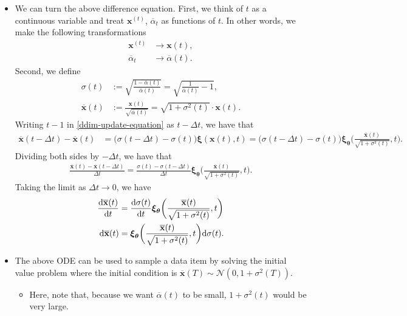 \documentclass[10pt]{article}
\newcommand{\dee}{\mathrm{d}}
\newcommand{\ve}[1]{\mathbf{#1}}
\newcommand{\ves}[1]{\boldsymbol{#1}}
\newcommand{\mcal}[1]{\mathcal{#1}}
\begin{document}
\begin{itemize}
  \item We can turn the above difference equation. First, we think of $t$ as a continuous variable and treat $\ve{x}^{(t)}$, $\overline{\alpha}_t$ as functions of $t$. In other words, we make the following transformations
  \begin{align*}
    \ve{x}^{(t)} &\rightarrow \ve{x}(t),\\
    \overline{\alpha}_t &\rightarrow \overline{\alpha}(t).
  \end{align*}
  Second, we define
  \begin{align*}
    \sigma(t) &:= \sqrt{\frac{1 - \overline{\alpha}(t)}{\overline{\alpha}(t)}} = \sqrt{\frac{1}{\overline{\alpha}(t)} - 1}, \\
    \overline{\ve{x}}(t)
    &:= \frac{\ve{x}(t)}{\sqrt{\overline{\alpha}(t)}} = \sqrt{1 + \sigma^2(t)} \cdot \ve{x}(t).    
  \end{align*}
  Writing $t-1$ in \eqref{ddim-update-equation} as $t - \Delta t$, we have that
  \begin{align*}
    \overline{\ve{x}}(t - \Delta t) - \overline{\ve{x}}(t)
    &= \big( \sigma(t - \Delta t) - \sigma(t) \big) \ves{\xi}(\ve{x}(t), t)
    = \big( \sigma(t - \Delta t) - \sigma(t) \big) \ves{\xi}_{\ves{\theta}}\bigg(\frac{\overline{\ve{x}}(t)}{\sqrt{1 + \sigma^2(t)}}, t\bigg).
  \end{align*}
  Dividing both sides by $-\Delta t$, we have that
  \begin{align*}
    \frac{\overline{\ve{x}}(t) - \overline{\ve{x}}(t - \Delta t)}{\Delta t}
    = \frac{\sigma(t) - \sigma(t - \Delta t)}{\Delta t} \ves{\xi}_{\ves{\theta}}\bigg( \frac{\overline{\ve{x}}(t)}{\sqrt{1 + \sigma^2(t)}}, t \bigg).
  \end{align*}
  Taking the limit as $\Delta t \rightarrow 0$, we have
  \begin{align}
    \frac{\dee \overline{\ve{x}}(t)}{\dee t}
    &= \frac{\dee \sigma(t)}{\dee t} \ves{\xi}_{\ves{\theta}}\bigg( \frac{\overline{\ve{x}}(t)}{\sqrt{1 + \sigma^2(t)}}, t \bigg) \notag \\
    \dee \overline{\ve{x}}(t) &= \ves{\xi}_{\ves{\theta}}\bigg( \frac{\overline{\ve{x}}(t)}{\sqrt{1 + \sigma^2(t)}}, t \bigg) \dee \sigma(t). \label{ddim-ode}
  \end{align}

  \item The above ODE can be used to sample a data item by solving the initial value problem where the initial condition is $\overline{\ve{x}}(T) \sim \mcal{N}(0, 1 + \sigma^2(T))$.
  \begin{itemize}
    \item Here, note that, because we want $\overline{\alpha}(t)$ to be small, $1 + \sigma^2(t)$ would be very large.
  \end{itemize}


\end{itemize}
\end{document}
